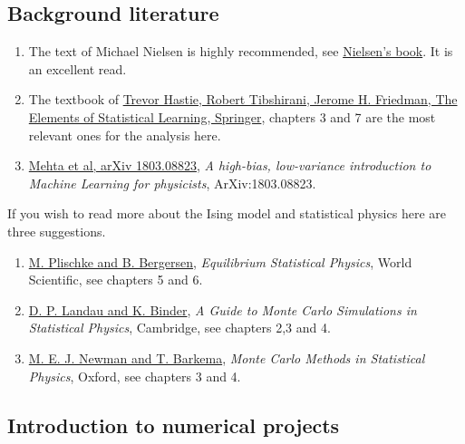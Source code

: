 \documentclass[%
oneside,                 %
final,                   %
10pt]{article}
\begin{document}
\subsection{Background literature}

\begin{enumerate}
\item The text of Michael Nielsen is highly recommended, see \href{{http://neuralnetworksanddeeplearning.com/}}{Nielsen's book}. It is an excellent read.

\item The textbook of \href{{https://www.springer.com/gp/book/9780387848570}}{Trevor Hastie, Robert Tibshirani, Jerome H. Friedman, The Elements of Statistical Learning, Springer}, chapters 3 and 7 are the most relevant ones for the analysis here. 

\item \href{{https://arxiv.org/abs/1803.08823}}{Mehta et al, arXiv 1803.08823}, \emph{A high-bias, low-variance introduction to Machine Learning for physicists}, ArXiv:1803.08823.
\end{enumerate}

\noindent
If you wish to read more about the Ising model and statistical physics here are three suggestions.

\begin{enumerate}
\item \href{{http://www.worldscientific.com/worldscibooks/10.1142/5660}}{M. Plischke and B. Bergersen}, \emph{Equilibrium Statistical Physics}, World Scientific, see chapters 5 and 6.

\item \href{{http://www.cambridge.org/no/academic/subjects/physics/computational-science-and-modelling/guide-monte-carlo-simulations-statistical-physics-4th-edition?format=HB}}{D. P. Landau and K. Binder}, \emph{A Guide to Monte Carlo Simulations in Statistical Physics}, Cambridge, see chapters 2,3 and 4.

\item \href{{https://global.oup.com/academic/product/monte-carlo-methods-in-statistical-physics-9780198517979?cc=no&lang=en&}}{M. E. J. Newman and T. Barkema}, \emph{Monte Carlo Methods in Statistical Physics}, Oxford, see chapters 3 and 4.
\end{enumerate}

\noindent
\subsection{Introduction to numerical projects}
\end{document}
